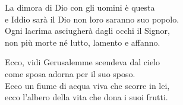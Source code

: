 \spazio


\spazio

\strofa La dimora di Dio con gli uomini è questa\\
e Iddio sarà il Dio non loro saranno suo popolo.\\
Ogni lacrima asciugherà dagli occhi il Signor,\\
non più morte né lutto, lamento e affanno.

\spazio


\spazio

\strofa Ecco, vidi Gerusalemme scendeva dal cielo\\
come sposa adorna per il suo sposo.\\
Ecco un fiume di acqua viva che scorre in lei,\\
ecco l'albero della vita che dona i suoi frutti.

\spazio

